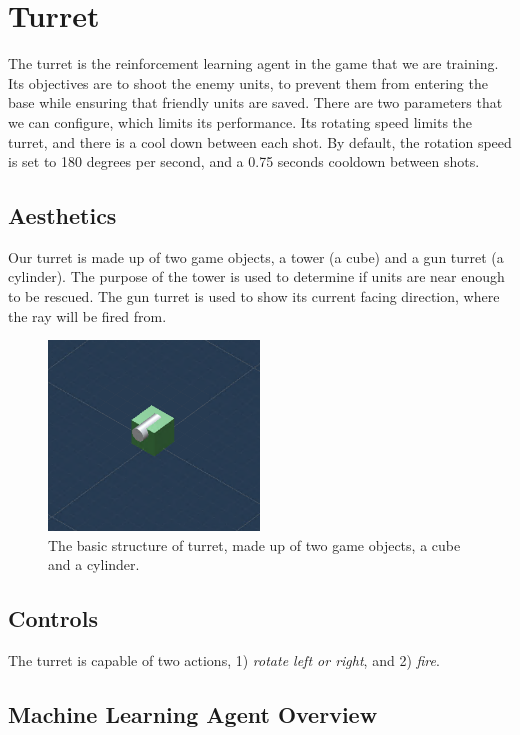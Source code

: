 \documentclass[conference]{IEEEtran}
\begin{document}
\section{Turret}

The turret is the reinforcement learning agent in the game that we are training. Its objectives are to shoot the enemy units, to prevent them from entering the base while ensuring that friendly units are saved. There are two parameters that we can configure, which limits its performance. Its rotating speed limits the turret, and there is a cool down between each shot. By default, the rotation speed is set to 180 degrees per second, and a 0.75 seconds cooldown between shots.

\subsection{Aesthetics}

Our turret is made up of two game objects, a tower (a cube) and a gun turret (a cylinder). The purpose of the tower is used to determine if units are near enough to be rescued. The gun turret is used to show its current facing direction, where the ray will be fired from.

\begin{figure}[h]
\centerline{\includegraphics[width=0.5\textwidth]{assets/turret}}
\caption{The basic structure of turret, made up of two game objects, a cube and a cylinder.}
\label{turret}
\end{figure}

\subsection{Controls}

The turret is capable of two actions, 1) \textit{rotate left or right}, and 2) \textit{fire}.

\subsection{Machine Learning Agent Overview}
\end{document}
